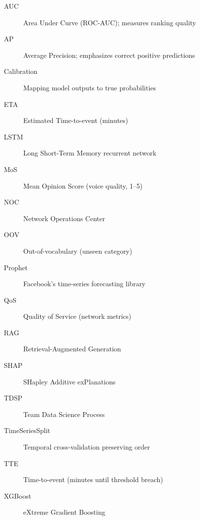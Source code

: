 \documentclass[11pt,a4paper,oneside]{report}
\begin{document}
\begin{description}
    \item[AUC] Area Under Curve (ROC-AUC); measures ranking quality
    \item[AP] Average Precision; emphasizes correct positive predictions
    \item[Calibration] Mapping model outputs to true probabilities
    \item[ETA] Estimated Time-to-event (minutes)
    \item[LSTM] Long Short-Term Memory recurrent network
    \item[MoS] Mean Opinion Score (voice quality, 1--5)
    \item[NOC] Network Operations Center
    \item[OOV] Out-of-vocabulary (unseen category)
    \item[Prophet] Facebook's time-series forecasting library
    \item[QoS] Quality of Service (network metrics)
    \item[RAG] Retrieval-Augmented Generation
    \item[SHAP] SHapley Additive exPlanations
    \item[TDSP] Team Data Science Process
    \item[TimeSeriesSplit] Temporal cross-validation preserving order
    \item[TTE] Time-to-event (minutes until threshold breach)
    \item[XGBoost] eXtreme Gradient Boosting
\end{description}
\end{document}
